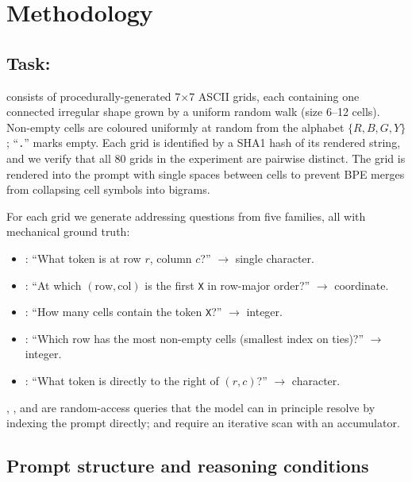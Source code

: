 \section{Methodology}
\label{sec:method}

\subsection{Task: \addrtask}

\addrtask consists of procedurally-generated 7$\times$7 ASCII grids,
each containing one connected irregular shape grown by a uniform random
walk (size 6--12 cells). Non-empty cells are coloured uniformly at
random from the alphabet $\{R, B, G, Y\}$; ``\texttt{.}'' marks empty.
Each grid is identified by a SHA1 hash of its rendered string, and we
verify that all 80 grids in the experiment are pairwise distinct. The
grid is rendered into the prompt with single spaces between cells to
prevent BPE merges from collapsing cell symbols into bigrams.

For each grid we generate addressing questions from five families,
all with mechanical ground truth:
\begin{itemize}[leftmargin=*,itemsep=0pt,topsep=0pt]
    \item \qpoint: ``What token is at row $r$, column $c$?'' $\rightarrow$ single character.
    \item \qlookup: ``At which $(\text{row}, \text{col})$ is the first \texttt{X} in row-major order?'' $\rightarrow$ coordinate.
    \item \qcount: ``How many cells contain the token \texttt{X}?'' $\rightarrow$ integer.
    \item \qrowmax: ``Which row has the most non-empty cells (smallest index on ties)?'' $\rightarrow$ integer.
    \item \qneighbor: ``What token is directly to the right of $(r, c)$?'' $\rightarrow$ character.
\end{itemize}
\qpoint, \qlookup, and \qneighbor are random-access queries that
the model can in principle resolve by indexing the prompt directly;
\qcount and \qrowmax require an iterative scan with an accumulator.

\subsection{Prompt structure and reasoning conditions}

